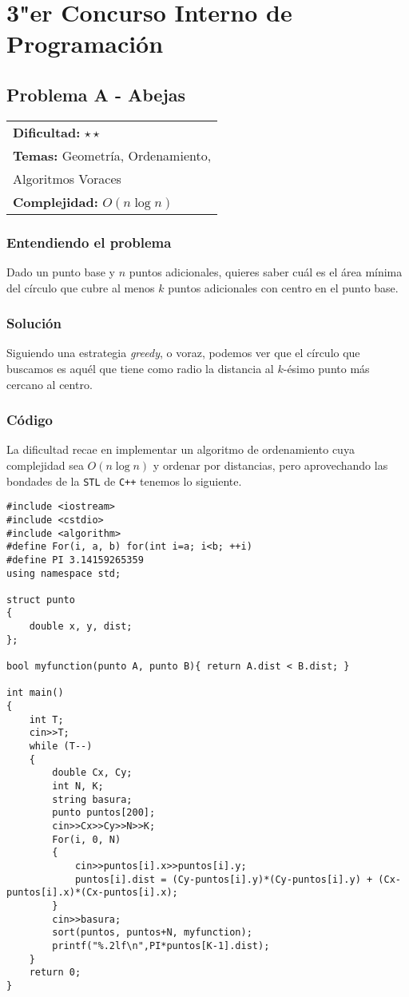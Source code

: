 \chapter{3"er Concurso Interno de Programación}

\section{Problema A - Abejas}

\hfill
\begin{tabular}{@{}l@{}}
\textbf{Dificultad:} $\star \star$ \\
\textbf{Temas:} Geometría, Ordenamiento, \\
Algoritmos Voraces \\
\textbf{Complejidad:} $O(n \log n)$
\end{tabular}

\subsection*{Entendiendo el problema}
Dado un punto base y $n$ puntos adicionales, quieres saber cuál es el área mínima del círculo que cubre al menos $k$ puntos adicionales con centro en el punto base.
\subsection*{Solución}
Siguiendo una estrategia \textit{greedy}, o voraz, podemos ver 
que el círculo que buscamos es aquél que tiene como radio la distancia al $k$-ésimo punto más cercano al centro.

\subsection*{Código}

La dificultad recae en implementar un algoritmo de ordenamiento cuya complejidad sea $O(n\log n)$ y ordenar por distancias, pero aprovechando las bondades de la \texttt{STL} de \texttt{C++} tenemos lo siguiente.

\begin{verbatim}
#include <iostream>
#include <cstdio>
#include <algorithm>
#define For(i, a, b) for(int i=a; i<b; ++i)
#define PI 3.14159265359
using namespace std;

struct punto
{
	double x, y, dist;
};

bool myfunction(punto A, punto B){ return A.dist < B.dist; }

int main()
{
	int T;
	cin>>T;
	while (T--)
	{
		double Cx, Cy;
		int N, K;
		string basura;
		punto puntos[200];
		cin>>Cx>>Cy>>N>>K;
		For(i, 0, N)
		{
			cin>>puntos[i].x>>puntos[i].y;
			puntos[i].dist = (Cy-puntos[i].y)*(Cy-puntos[i].y) + (Cx-puntos[i].x)*(Cx-puntos[i].x);
		}
		cin>>basura;
		sort(puntos, puntos+N, myfunction);
		printf("%.2lf\n",PI*puntos[K-1].dist);
	}
	return 0;
}
\end{verbatim}

